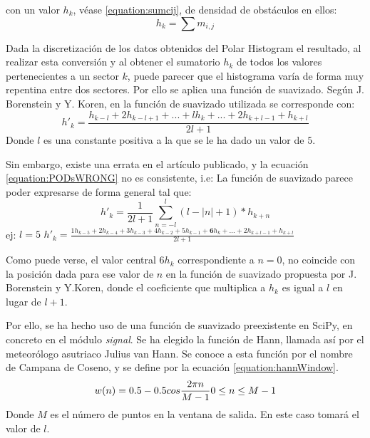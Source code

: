 con un valor $h_k$, véase \ref{equation:sumcij}, de densidad de obstáculos en ellos:
\begin{equation}
\label{equation:sumcij}
h_k = \sum m_{i,j}
\end{equation}

Dada la discretización de los datos obtenidos del Polar Histogram el resultado, al realizar esta conversión y al obtener el sumatorio $h_k$ de todos los valores pertenecientes a un sector $k$, puede parecer que el histograma varía de forma muy repentina entre dos sectores. Por ello se aplica una función de suavizado. 
Según J. Borenstein y Y. Koren, en \citep{art:BorensteinKorenVFH} la función de suavizado utilizada se corresponde con: 
\begin{equation}
\label{equation:PODsWRONG}
h'_k = \frac{h_{k-l} +2h_{k-l+1} + ... + lh_k + ... + 2h_{k+l-1} + h_{k+l}}{2l+1}
\end{equation}
Donde $l$  es una constante positiva a la que se le ha dado un valor de $5$. 

Sin embargo, existe una errata en el artículo publicado, y la ecuación \ref{equation:PODsWRONG} no es consistente, i.e:
La función de suavizado parece poder expresarse de forma general tal que:
\begin{equation}
\label{equation:PODsWRONGgen}
h'_k =\frac{1}{2l+1} \sum_{n=-l}^{l} (l-  |n| +1)*h_{k+n}
\end{equation}
ej: $l = 5$ $ h'_k = \frac{1h_{k-5} +2h_{k-4} + 3h_{k-3} + 4h_{k-2} + 5h_{k-1} + \textbf{6}h_k + ... + 2h_{k+l-1} + h_{k+l}}{2l+1} $

Como puede verse, el valor central $ 6h_k $ correspondiente a $n=0$, no coincide con la posición dada para ese valor de $n$ en la función de suavizado propuesta por J. Borenstein y Y.Koren, donde el coeficiente que multiplica a $h_k$ es igual a $l$ en lugar de $l+1$.

Por ello, se ha hecho uso de una función de suavizado preexistente en SciPy, en concreto en el módulo \textit{signal}. Se ha elegido la función de Hann, llamada así por el meteorólogo asutriaco Julius van Hann. Se conoce a esta función por el nombre de Campana de Coseno, y se define por la ecuación \ref{equation:hannWindow}.
\begin{equation}
\label{equation:hannWindow}
w(n)=0.5 - 0.5 cos\frac{2 \pi n}{M-1}\\
0 \leq n \leq M-1
\end{equation}
Donde $M$ es el número de puntos en la ventana de salida. En este caso tomará el valor de $l$.


